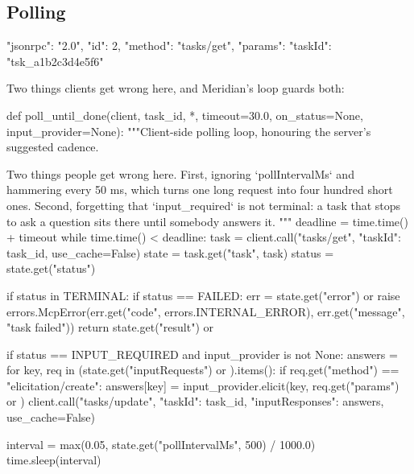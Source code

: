 \subsection{Polling}

\begin{wire}
{ "jsonrpc": "2.0", "id": 2, "method": "tasks/get",
  "params": { "taskId": "tsk_a1b2c3d4e5f6" } }
\end{wire}

Two things clients get wrong here, and Meridian's loop guards both:

\begin{py}
def poll_until_done(client, task_id, *, timeout=30.0,
                    on_status=None, input_provider=None):
    """Client-side polling loop, honouring the server's suggested cadence.

    Two things people get wrong here. First, ignoring `pollIntervalMs` and
    hammering every 50 ms, which turns one long request into four hundred short
    ones. Second, forgetting that `input_required` is not terminal: a task that
    stops to ask a question sits there until somebody answers it.
    """
    deadline = time.time() + timeout
    while time.time() < deadline:
        task = client.call("tasks/get", {"taskId": task_id}, use_cache=False)
        state = task.get("task", task)
        status = state.get("status")

        if status in TERMINAL:
            if status == FAILED:
                err = state.get("error") or {}
                raise errors.McpError(err.get("code", errors.INTERNAL_ERROR),
                                      err.get("message", "task failed"))
            return state.get("result") or {}

        if status == INPUT_REQUIRED and input_provider is not None:
            answers = {}
            for key, req in (state.get("inputRequests") or {}).items():
                if req.get("method") == "elicitation/create":
                    answers[key] = input_provider.elicit(key,
                                                         req.get("params") or {})
            client.call("tasks/update",
                        {"taskId": task_id, "inputResponses": answers},
                        use_cache=False)

        interval = max(0.05, state.get("pollIntervalMs", 500) / 1000.0)
        time.sleep(interval)
\end{py}

